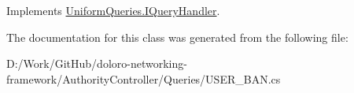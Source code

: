Implements \mbox{\hyperlink{interface_uniform_queries_1_1_i_query_handler_abda1ccf47ad2889fbd015955965046e7}{Uniform\+Queries.\+I\+Query\+Handler}}.



The documentation for this class was generated from the following file\+:\begin{DoxyCompactItemize}
\item 
D\+:/\+Work/\+Git\+Hub/doloro-\/networking-\/framework/\+Authority\+Controller/\+Queries/U\+S\+E\+R\+\_\+\+B\+A\+N.\+cs\end{DoxyCompactItemize}
